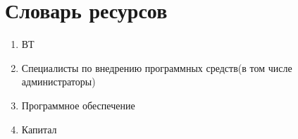 \section{Словарь ресурсов}
\begin{enumerate}
\item ВТ
\item Специалисты по внедрению программных средств(в том числе администраторы)
\item Программное обеспечение­
\item Капитал
\end{enumerate}
